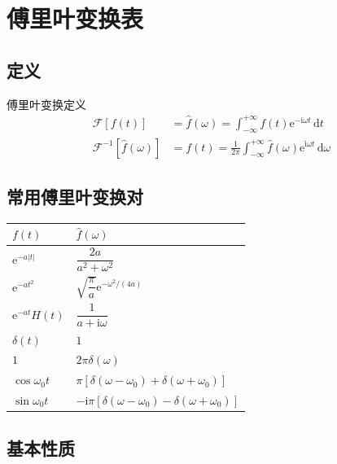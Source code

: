 
\chapter{傅里叶变换表}

\section{定义}
\begin{dingliyi}{傅里叶变换定义}{}
\begin{align}
\mathcal{F}[f(t)] &= \hat{f}(\omega) = \int_{-\infty}^{+\infty} f(t)\mathrm{e}^{-\mathrm{i}\omega t}\,\mathrm{d}t \\
\mathcal{F}^{-1}[\hat{f}(\omega)] &= f(t) = \frac{1}{2\pi}\int_{-\infty}^{+\infty} \hat{f}(\omega)\mathrm{e}^{\mathrm{i}\omega t}\,\mathrm{d}\omega
\end{align}
\end{dingliyi}

\section{常用傅里叶变换对}

\begin{table}[htbp]
\centering
\begin{tabular}{ll}
\toprule
$f(t)$ & $\hat{f}(\omega)$ \\
\midrule
$\mathrm{e}^{-a|t|}$ & $\dfrac{2a}{a^2+\omega^2}$ \\[8pt]
$\mathrm{e}^{-at^2}$ & $\sqrt{\dfrac{\pi}{a}}\mathrm{e}^{-\omega^2/(4a)}$ \\[8pt]
$\mathrm{e}^{-at}H(t)$ & $\dfrac{1}{a+\mathrm{i}\omega}$ \\[8pt]
$\delta(t)$ & $1$ \\[4pt]
$1$ & $2\pi\delta(\omega)$ \\[4pt]
$\cos\omega_0 t$ & $\pi[\delta(\omega-\omega_0) + \delta(\omega+\omega_0)]$ \\
$\sin\omega_0 t$ & $-\mathrm{i}\pi[\delta(\omega-\omega_0) - \delta(\omega+\omega_0)]$ \\
\bottomrule
\end{tabular}
\end{table}

\section{基本性质}

